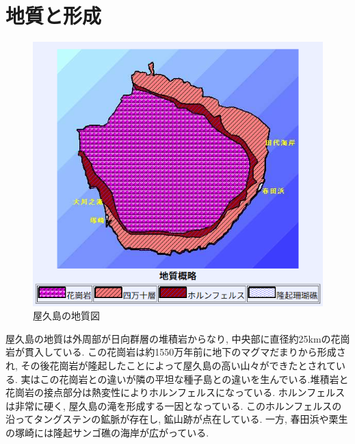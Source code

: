 \documentclass[10pt,titlepage,a5paper]{ltjsbook}
\begin{document}
  \section{地質と形成}
    \begin{minipage}{0.38\columnwidth}
      \begin{figure}[H]
        \centering
        \includegraphics[width=\columnwidth]{yakushima_geology.png}
        \caption{屋久島の地質図}
        \label{fig:yakushima_geology}
      \end{figure}
    \end{minipage}
    \hfill
    \begin{minipage}{0.58\columnwidth}
      屋久島の地質は外周部が日向群層の堆積岩からなり, 中央部に直径約25kmの花崗岩が貫入している. この花崗岩は約1550万年前に地下のマグマだまりから形成され, その後花崗岩が隆起したことによって屋久島の高い山々ができたとされている.
      実はこの花崗岩との違いが隣の平坦な種子島との違いを生んでいる.堆積岩と花崗岩の接点部分は熱変性によりホルンフェルスになっている. ホルンフェルスは非常に硬く, 屋久島の滝を形成する一因となっている.
      このホルンフェルスの沿ってタングステンの鉱脈が存在し, 鉱山跡が点在している.
      一方, 春田浜や栗生の塚崎には隆起サンゴ礁の海岸が広がっている.
    \end{minipage}
    \vspace{2em}
\end{document}
